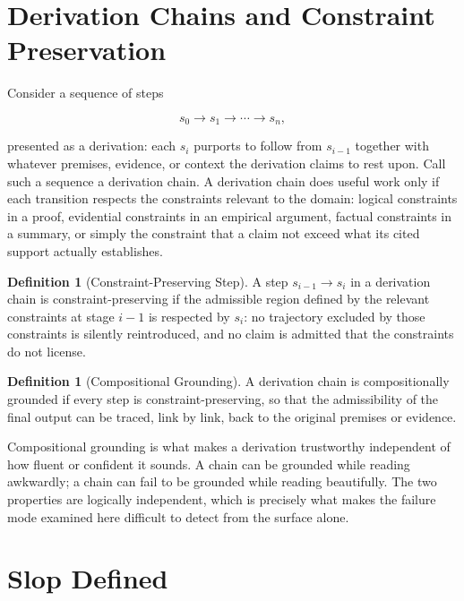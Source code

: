 \documentclass[11pt,oneside]{book}
\theoremstyle{plain}
\theoremstyle{definition}
\newtheorem{definition}[theorem]{Definition}
\theoremstyle{remark}
\begin{document}
\section{Derivation Chains and Constraint Preservation}

Consider a sequence of steps

\begin{equation}
s_0
\rightarrow
s_1
\rightarrow
\cdots
\rightarrow
s_n,
\end{equation}

presented as a derivation: each \(s_i\) purports to follow from \(s_{i-1}\) together with whatever premises, evidence, or context the derivation claims to rest upon. Call such a sequence a derivation chain. A derivation chain does useful work only if each transition respects the constraints relevant to the domain: logical constraints in a proof, evidential constraints in an empirical argument, factual constraints in a summary, or simply the constraint that a claim not exceed what its cited support actually establishes.

\begin{definition}[Constraint-Preserving Step]
A step \(s_{i-1}\rightarrow s_i\) in a derivation chain is constraint-preserving if the admissible region defined by the relevant constraints at stage \(i-1\) is respected by \(s_i\): no trajectory excluded by those constraints is silently reintroduced, and no claim is admitted that the constraints do not license.
\end{definition}

\begin{definition}[Compositional Grounding]
A derivation chain is compositionally grounded if every step is constraint-preserving, so that the admissibility of the final output can be traced, link by link, back to the original premises or evidence.
\end{definition}

Compositional grounding is what makes a derivation trustworthy independent of how fluent or confident it sounds. A chain can be grounded while reading awkwardly; a chain can fail to be grounded while reading beautifully. The two properties are logically independent, which is precisely what makes the failure mode examined here difficult to detect from the surface alone.

\section{Slop Defined}
\end{document}

